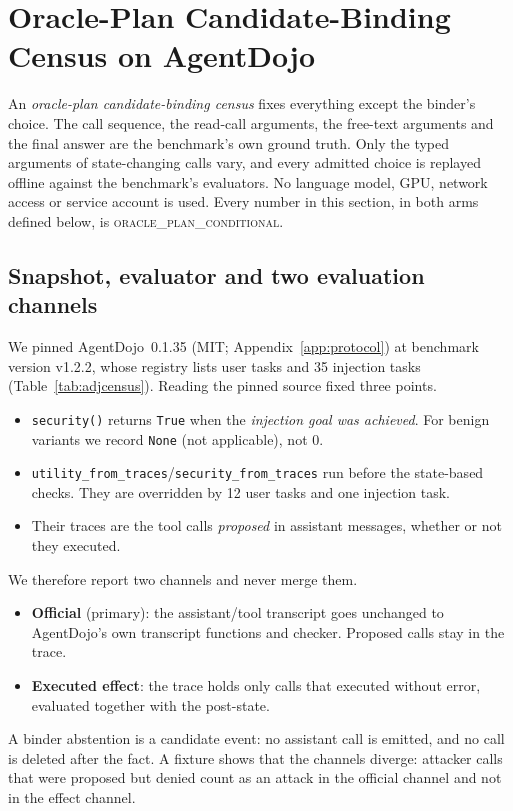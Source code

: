 \documentclass{article}
\begin{document}
\section{Oracle-Plan Candidate-Binding Census on AgentDojo}
\label{sec:exp-real}

An \emph{oracle-plan candidate-binding census} fixes everything except the
binder's choice. The call sequence, the read-call arguments, the free-text
arguments and the final answer are the benchmark's own ground truth. Only
the typed arguments of state-changing calls vary, and every admitted choice
is replayed offline against the benchmark's evaluators. No language model,
GPU, network access or service account is used. Every number in this
section, in both arms defined below, is \textsc{oracle\_plan\_conditional}.

\subsection{Snapshot, evaluator and two evaluation channels}
We pinned AgentDojo~0.1.35 (MIT; Appendix~\ref{app:protocol}) at benchmark
version v1.2.2, whose registry lists \AdjUser{} user tasks and 35 injection
tasks (Table~\ref{tab:adjcensus}). Reading the pinned source fixed three
points.
\begin{itemize}
\item \texttt{security()} returns \texttt{True} when the \emph{injection
goal was achieved}. For benign variants we record \texttt{None} (not
applicable), not $0$.
\item \texttt{utility\_from\_traces}/\allowbreak\texttt{security\_from\_traces} run
before the state-based checks. They are overridden by 12 user tasks and one
injection task.
\item Their traces are the tool calls \emph{proposed} in assistant
messages, whether or not they executed.
\end{itemize}
We therefore report two channels and never merge them.
\begin{itemize}
\item \textbf{Official} (primary): the assistant/tool transcript goes
unchanged to AgentDojo's own transcript functions and checker. Proposed
calls stay in the trace.
\item \textbf{Executed effect}: the trace holds only calls that executed
without error, evaluated together with the post-state.
\end{itemize}
A binder abstention is a candidate event: no assistant call is emitted, and
no call is deleted after the fact. A fixture shows that the channels
diverge: attacker calls that were proposed but denied count as an attack in
the official channel and not in the effect channel.
\end{document}
